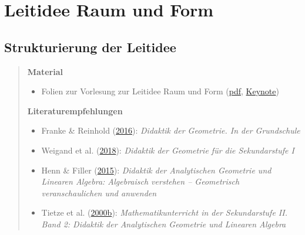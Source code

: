 \documentclass[
]{scrbook}
\providecommand{\tightlist}{%
  \setlength{\itemsep}{0pt}\setlength{\parskip}{0pt}}
\theoremstyle{definition}
\theoremstyle{definition}
\theoremstyle{definition}
\theoremstyle{definition}
\theoremstyle{remark}
\begin{document}
\hypertarget{leitidee-raum-und-form}{%
\chapter{Leitidee Raum und Form}\label{leitidee-raum-und-form}}

\hypertarget{strukturierung-der-leitidee-raum-und-form}{%
\section{Strukturierung der Leitidee}\label{strukturierung-der-leitidee-raum-und-form}}

\begin{quote}
\textbf{Material}

\begin{itemize}
\tightlist
\item
  Folien zur Vorlesung zur Leitidee Raum und Form (\href{files/Stoffdidaktik-WiSe2223-Kap12.pdf}{pdf}, \href{files/Stoffdidaktik-WiSe2223-Kap12.key}{Keynote})
\end{itemize}

\textbf{Literaturempfehlungen}

\begin{itemize}
\tightlist
\item
  Franke \& Reinhold (\protect\hyperlink{ref-Franke2016}{2016}): \emph{Didaktik der Geometrie. In der Grundschule}
\item
  Weigand et al. (\protect\hyperlink{ref-Weigand2018}{2018}): \emph{Didaktik der Geometrie für die Sekundarstufe I}
\item
  Henn \& Filler (\protect\hyperlink{ref-Henn2015}{2015}): \emph{Didaktik der Analytischen Geometrie und Linearen Algebra: Algebraisch verstehen -- Geometrisch veranschaulichen und anwenden}
\item
  Tietze et al. (\protect\hyperlink{ref-Tietze:2000}{2000b}): \emph{Mathematikunterricht in der Sekundarstufe II. Band 2: Didaktik der Analytischen Geometrie und Linearen Algebra}
\end{itemize}
\end{quote}
\end{document}
